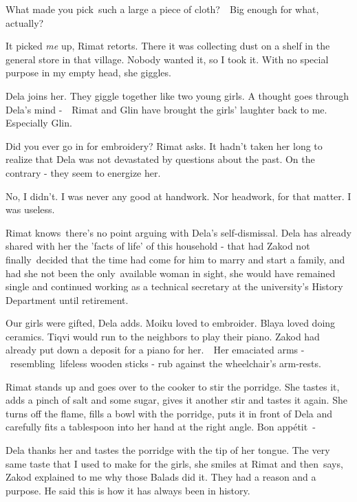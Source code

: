 \documentclass[twoside,11pt]{book}
\begin{document}
{\textquotedbl}What made you pick~such a large a piece of cloth?\ \ Big enough for what, actually?{\textquotedbl}

{\textquotedbl}It picked \textit{me} up,{\textquotedbl} Rimat retorts. {\textquotedbl}There it was collecting dust on a
shelf in the general store in that village. Nobody wanted it, so I took it. With no special purpose in my empty
head,{\textquotedbl} she giggles.

Dela joins her. They giggle together like two young girls. A thought goes through Dela's mind -\ \ Rimat and Glin have
brought the girls' laughter back to me. Especially Glin. 

{\textquotedbl}Did you ever go in for embroidery?{\textquotedbl} Rimat asks. It hadn't taken her long to realize that
Dela was not devastated by questions about the past. On the contrary - they seem to energize her. 

{\textquotedbl}No, I didn't. I was never any good at handwork. Nor headwork, for that matter. I was
useless.{\textquotedbl} 

Rimat knows~there's no point arguing with Dela's self-dismissal. Dela has already shared with her the 'facts of life' of
this household -  that had Zakod not finally~decided that the time had come for him to marry and start a family, and
had she not been the only~available woman in sight, she would have remained single and continued working as a technical
secretary at the university's History Department until retirement.\ 

{\textquotedbl}Our girls were gifted,{\textquotedbl} Dela adds. {\textquotedbl}Moiku loved to embroider. Blaya loved
doing ceramics. Tiqvi would run to the neighbors to play their piano. Zakod had already put down a deposit for a piano
for her.{\textquotedbl}\ \ Her emaciated arms -\ resembling\ lifeless wooden sticks - rub against the wheelchair's
arm-rests. 

Rimat stands up and goes over to the cooker to stir the porridge. She tastes it, adds a pinch of salt and some sugar,
gives it another stir and tastes it again. She turns off the flame, fills a bowl with the porridge, puts it in front of
Dela and carefully fits a tablespoon into her hand at the right angle. {\textquotedbl}Bon app\'etit\ {}-{\textquotedbl}


Dela thanks her and tastes the porridge with the tip of her tongue. {\textquotedbl}The very same taste that I used to
make for the girls,{\textquotedbl} she smiles at Rimat and then\ says, {\textquotedbl}Zakod explained to me why those
Balads did it. They had a reason and a purpose. He said this is how it has always been in history.{\textquotedbl} \ 
\end{document}
